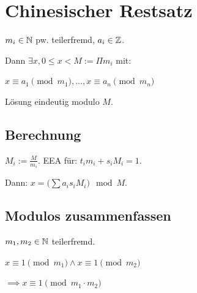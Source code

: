 \section*{Chinesischer Restsatz}
$m_i\in\mathbb{N}$ pw. teilerfremd, $a_i\in\mathbb{Z}$.

Dann $\exists x, 0 \le x < M := \Pi m_i$ mit:

$x \equiv a_1 \pmod{m_1}, \ldots, x \equiv a_n \pmod{m_n}$

Lösung eindeutig modulo $M$.

\subsection*{Berechnung}
$M_i := \frac{M}{m_i}$. EEA für: $t_i m_i + s_i M_i = 1$.

Dann: $x = \big(\sum a_i s_i M_i\big) \mod M$.

\subsection*{Modulos zusammenfassen}
$m_1,m_2\in\mathbb{N}$ teilerfremd.

$x \equiv 1 \pmod{m_1} \land x \equiv 1 \pmod{m_2}$

$\implies x \equiv 1 \pmod{m_1\cdot m_2}$
